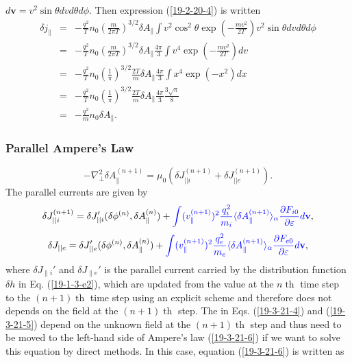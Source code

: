 \documentclass{article}
\newcommand{\tmcolor}[2]{{\color{#1}{#2}}}
\newcommand{\tmop}[1]{\ensuremath{\operatorname{#1}}}
\begin{document}
$d\mathbf{v}= v^2 \sin \theta d v d \theta d \phi$. Then expression
(\ref{19-2-20-4}) is written
\begin{eqnarray}
  \delta j_{\parallel} & = & - \frac{q^2}{T} n_0 \left( \frac{m}{2 \pi T}
  \right)^{3 / 2} \delta A_{\parallel} \int v^2 \cos^2 \theta \exp \left( -
  \frac{m v^2}{2 T} \right) v^2 \sin \theta d v d \theta d \phi \nonumber\\
  & = & - \frac{q^2}{T} n_0 \left( \frac{m}{2 \pi T} \right)^{3 / 2} \delta
  A_{\parallel} \frac{4 \pi}{3} \int v^4 \exp \left( - \frac{m v^2}{2 T}
  \right) d v \\
  & = & - \frac{q^2}{T} n_0 \left( \frac{1}{\pi} \right)^{3 / 2} \frac{2
  T}{m} \delta A_{\parallel} \frac{4 \pi}{3} \int x^4 \exp (- x^2) d x
  \nonumber\\
  & = & - \frac{q^2}{T} n_0 \left( \frac{1}{\pi} \right)^{3 / 2} \frac{2
  T}{m} \delta A_{\parallel} \frac{4 \pi}{3} \frac{3 \sqrt{\pi}}{8}
  \nonumber\\
  & = & - \frac{q^2}{m} n_0 \delta A_{\parallel} . 
\end{eqnarray}

\subsubsection{Parallel Ampere's Law}

\begin{equation}
  \label{19-3-21-6} - \nabla^2_{\perp} \delta A_{\parallel}^{(n + 1)} = \mu_0 
  (\delta J_{||i}^{(n + 1)} + \delta J_{||e}^{(n + 1)}) .
\end{equation}
The parallel currents are given by
\begin{equation}
  \label{19-3-21-4} \delta J_{|| i}^{(n + 1)} = \delta J_{|| i}' (\delta
  \phi^{(n)}, \delta A_{\parallel}^{(n)}) + \tmcolor{blue}{\int
  (v_{\parallel}^{(n + 1)})^2 \frac{q^2_i}{m_i} \langle \delta
  A_{\parallel}^{(n + 1)} \rangle_{\alpha} \frac{\partial F_{i 0}}{\partial
  \varepsilon} d\mathbf{v}},
\end{equation}
\begin{equation}
  \label{19-3-21-5} \delta J_{|| e} = \delta J_{|| e}' (\delta \phi^{(n)},
  \delta A_{\parallel}^{(n)}) + \tmcolor{blue}{\int (v_{\parallel}^{(n +
  1)})^2 \frac{q^2_e}{m_e} \langle \delta A_{\parallel}^{(n + 1)}
  \rangle_{\alpha} \frac{\partial F_{e 0}}{\partial \varepsilon} d\mathbf{v}},
\end{equation}
where $\delta J_{\parallel i}'$ and $\delta J_{\parallel e}'$ is the parallel
current carried by the distribution function $\delta h$ in Eq.
(\ref{19-1-3-e2}), which are updated from the value at the $n \tmop{th}$ time
step to the $(n + 1) \tmop{th}$ time step using an explicit scheme and
therefore does not depends on the field at the $(n + 1) \tmop{th}$ step.
The\tmcolor{blue}{ blue terms} in Eqs. (\ref{19-3-21-4}) and (\ref{19-3-21-5})
depend on the unknown field at the $(n + 1) \tmop{th}$ step and thus need to
be moved to the left-hand side of Ampere's law (\ref{19-3-21-6}) if we want to
solve this equation by direct methods. In this case, equation
(\ref{19-3-21-6}) is written as
\end{document}
